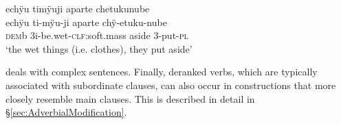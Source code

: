 \ea\label{ex:Sketch-headless-RC}
\begingl
\glpreamble echÿu timÿuji aparte chetukunube\\
\gla echÿu ti-mÿu-ji aparte chÿ-etuku-nube\\
\glb \textsc{dem}b 3i-be.wet-\textsc{clf:}soft.mass aside 3-put-\textsc{pl}\\
\glft ‘the wet things (i.e. clothes), they put aside’\\
\endgl
\trailingcitation{[jxx-p151016l-2.132]}
\xe
{}

 deals with complex sentences. Finally, deranked verbs, which are typically associated with subordinate clauses, can also occur in constructions that more closely resemble main clauses. This is described in detail in §\ref{sec:AdverbialModification}.
